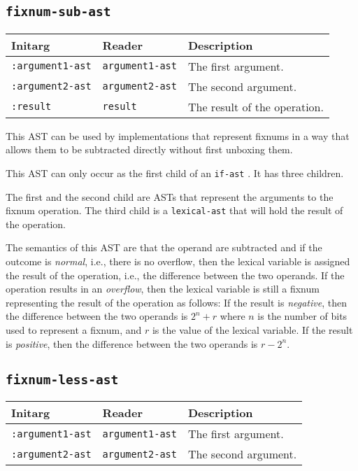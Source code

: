 \subsection{\texttt{fixnum-sub-ast}}
\label{fixnum-sub-ast}

\begin{tabular}{|l|l|l|}
\hline
Initarg & Reader & Description\\
\hline\hline
\texttt{:argument1-ast} & \texttt{argument1-ast} & The first argument.\\
\hline
\texttt{:argument2-ast} & \texttt{argument2-ast} & The second argument.\\
\hline
\texttt{:result} & \texttt{result} & The result of the operation.\\
\hline
\end{tabular}

This AST can be used by implementations that represent fixnums in a
way that allows them to be subtracted directly without first unboxing
them.

This AST can only occur as the first child of an \texttt{if-ast}
.  It has three children.

The first and the second child are ASTs that represent the arguments
to the fixnum operation.  The third child is a
\texttt{lexical-ast} that will hold the result of the operation.

The semantics of this AST are that the operand are subtracted and if
the outcome is \emph{normal}, i.e., there is no overflow, then the
lexical variable is assigned the result of the operation, i.e., the
difference between the two operands.  If the operation results in an
\emph{overflow}, then the lexical variable is still a fixnum
representing the result of the operation as follows: If the result is
\emph{negative}, then the difference between the two operands is $2^n
+ r$ where $n$ is the number of bits used to represent a fixnum, and
$r$ is the value of the lexical variable.  If the result is
\emph{positive}, then the difference between the two operands is $r -
2^n$.

\subsection{\texttt{fixnum-less-ast}}
\label{fixnum-less-ast}

\begin{tabular}{|l|l|l|}
\hline
Initarg & Reader & Description\\
\hline\hline
\texttt{:argument1-ast} & \texttt{argument1-ast} & The first argument.\\
\hline
\texttt{:argument2-ast} & \texttt{argument2-ast} & The second argument.\\
\hline
\end{tabular}

